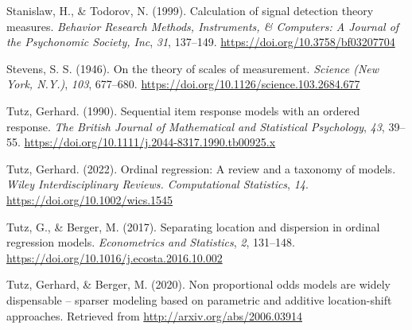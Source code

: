 \documentclass[
  man,floatsintext]{apa6}
\newlength{\cslhangindent}
\newenvironment{CSLReferences}[2] %
 {\begin{list}{}{%
  \setlength{\itemindent}{0pt}
  \setlength{\leftmargin}{0pt}
  \setlength{\parsep}{0pt}
  \ifodd #1
   \setlength{\leftmargin}{\cslhangindent}
   \setlength{\itemindent}{-1\cslhangindent}
  \fi
  \setlength{\itemsep}{#2\baselineskip}}}
 {\end{list}}
\begin{document}
\begin{CSLReferences}{1}{0}
Stanislaw, H., \& Todorov, N. (1999). Calculation of signal detection theory measures. \emph{Behavior Research Methods, Instruments, \& Computers: A Journal of the Psychonomic Society, Inc}, \emph{31}, 137--149. \url{https://doi.org/10.3758/bf03207704}

Stevens, S. S. (1946). On the theory of scales of measurement. \emph{Science (New York, N.Y.)}, \emph{103}, 677--680. \url{https://doi.org/10.1126/science.103.2684.677}

Tutz, Gerhard. (1990). Sequential item response models with an ordered response. \emph{The British Journal of Mathematical and Statistical Psychology}, \emph{43}, 39--55. \url{https://doi.org/10.1111/j.2044-8317.1990.tb00925.x}

Tutz, Gerhard. (2022). Ordinal regression: A review and a taxonomy of models. \emph{Wiley Interdisciplinary Reviews. Computational Statistics}, \emph{14}. \url{https://doi.org/10.1002/wics.1545}

Tutz, G., \& Berger, M. (2017). Separating location and dispersion in ordinal regression models. \emph{Econometrics and Statistics}, \emph{2}, 131--148. \url{https://doi.org/10.1016/j.ecosta.2016.10.002}

Tutz, Gerhard, \& Berger, M. (2020). Non proportional odds models are widely dispensable -- sparser modeling based on parametric and additive location-shift approaches. Retrieved from \url{http://arxiv.org/abs/2006.03914}

\end{CSLReferences}
\end{document}
